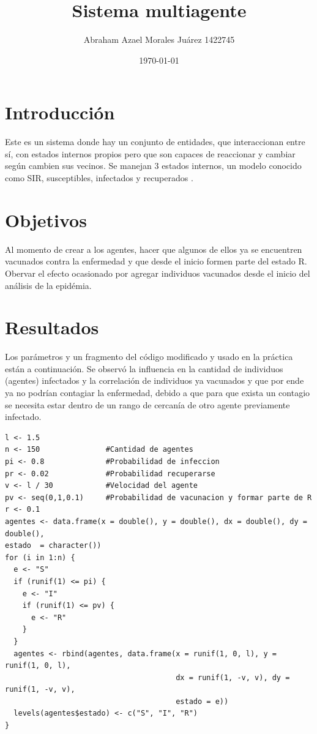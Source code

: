 \documentclass{article}
\author{Abraham Azael Morales Juárez  1422745}
\title{Sistema multiagente}
\date{\today}
\begin{document}
\maketitle

\section{Introducción}
Este es un sistema donde hay un conjunto de entidades, que interaccionan entre sí, con estados internos propios pero que son capaces de reaccionar y cambiar según cambien sus vecinos. Se manejan 3 estados internos, un modelo conocido como SIR, susceptibles, infectados y recuperados \cite{REF1}. 
\section{Objetivos}
Al momento de crear a los agentes, hacer que algunos de ellos ya se encuentren vacunados contra la enfermedad y que desde el inicio formen parte del estado R.\\
Obervar el efecto ocasionado por agregar individuos vacunados desde el inicio del análisis de la epidémia.
\section{Resultados}
Los parámetros y un fragmento del código \citep{REF1} modificado y usado en la práctica están a continuación.  Se observó la influencia en la cantidad de individuos (agentes) infectados y la correlación de individuos ya vacunados y que por ende ya no podrían contagiar la enfermedad, debido a que para que exista un contagio se necesita estar dentro de un rango de cercanía de otro agente previamente infectado. 

\begin{lstlisting}[frame=single]
l <- 1.5
n <- 150               #Cantidad de agentes
pi <- 0.8              #Probabilidad de infeccion
pr <- 0.02             #Probabilidad recuperarse
v <- l / 30            #Velocidad del agente
pv <- seq(0,1,0.1)     #Probabilidad de vacunacion y formar parte de R
r <- 0.1 
agentes <- data.frame(x = double(), y = double(), dx = double(), dy = double(), 
estado  = character())
for (i in 1:n) {
  e <- "S"
  if (runif(1) <= pi) {
    e <- "I"
    if (runif(1) <= pv) {
      e <- "R"
    }
  }
  agentes <- rbind(agentes, data.frame(x = runif(1, 0, l), y = runif(1, 0, l),
                                       dx = runif(1, -v, v), dy = runif(1, -v, v),
                                       estado = e))
  levels(agentes$estado) <- c("S", "I", "R")
}
   \end{lstlisting}
\end{document}
